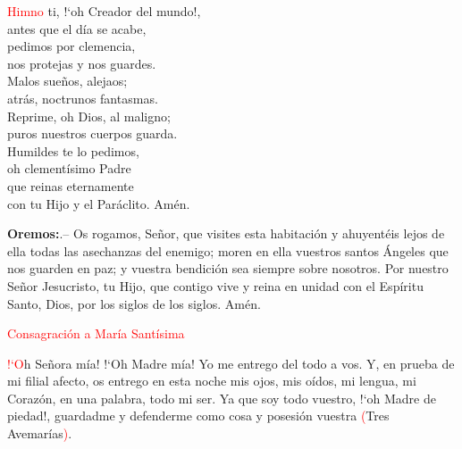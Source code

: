 \documentclass[9pt]{article}
\begin{document}
\begin{multicols}{2}
      \vspace{1mm}

      \begin{otherlanguage}{latin}
            
      \end{otherlanguage}

      \vspace{1mm}

      \noindent\textcolor{red}{Himno}
      ti, {!`}oh Creador del mundo!,\\
      antes que el día se acabe,\\
      pedimos por clemencia,\\
      nos protejas y nos guardes.\\
      Malos sueños, alejaos;\\
      atrás, noctrunos fantasmas.\\
      Reprime, oh Dios, al maligno;\\
      puros nuestros cuerpos guarda.\\
      Humildes te lo pedimos,\\
      oh clementísimo Padre\\
      que reinas eternamente\\
      con tu Hijo y el Paráclito. Amén.

      \vspace{1mm}


      \textbf{Oremos:}.-- Os rogamos, Señor, que visites esta habitación y ahuyentéis lejos de ella todas las asechanzas del enemigo; moren en ella vuestros santos Ángeles
      que nos guarden en paz; y vuestra bendición sea siempre sobre nosotros. Por nuestro Señor Jesucristo, tu Hijo, que contigo vive y reina en unidad
      con el Espíritu Santo, Dios, por los siglos de los siglos. Amén.

      \vspace{1mm}

      \textcolor{red}{Consagración a María Santísima}

      \textcolor{red}{{!`}O}h Señora mía! {!`}Oh Madre mía! Yo me entrego del todo a vos. Y, en prueba de mi filial afecto, os entrego en esta noche mis ojos, mis oídos, mi lengua, mi Corazón,
      en una palabra, todo mi ser. Ya que soy todo vuestro, {!`}oh Madre de piedad!, guardadme y defenderme como cosa y posesión vuestra \textcolor{red}{(}Tres Avemarías\textcolor{red}{)}.
      

\end{multicols}
\end{document}
